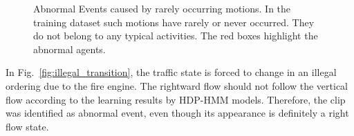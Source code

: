 \begin{figure}[!htbp]
	\centering
	\hspace{1.5cm}
	\caption[Abnormal Events caused by rarely occurring motions]{Abnormal Events caused by rarely occurring motions. In the training dataset such motions have rarely or never occurred. They do not belong to any typical activities. The red boxes highlight the abnormal agents.}
	\label{fig:rare_motion_abnormalevents}
\end{figure}

In Fig.~\ref{fig:illegal_transition}, the traffic state is forced to change in an illegal ordering due to the fire engine. 
The rightward flow should not follow the vertical flow according to the learning results by HDP-HMM models. Therefore, the  clip was identified as abnormal event, even though its appearance is definitely a right flow state.

